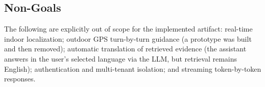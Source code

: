 \subsection{Non-Goals}
The following are explicitly out of scope for the implemented artifact:
real-time indoor localization; outdoor GPS turn-by-turn guidance (a
prototype was built and then removed); automatic translation of retrieved
evidence (the assistant answers in the user's selected language via the
LLM, but retrieval remains English); authentication and multi-tenant
isolation; and streaming token-by-token responses.
